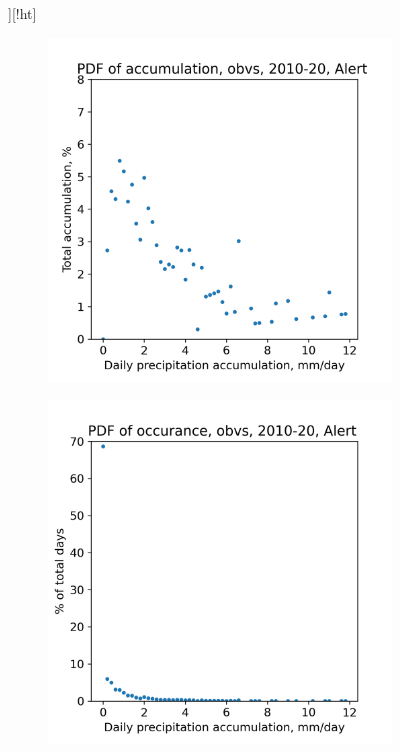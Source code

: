 \documentclass[draft]{agujournal2019}
\begin{document}
    \begin{figure}[h!tbp]][!ht]
\centering
    \begin{subfigure}{0.45\linewidth}
        \includegraphics[width=\linewidth]{figures/cdf_pdf/pdf_accum_alert_10_20.png}
    \caption{}
    \end{subfigure}
\hfil
    \begin{subfigure}{0.45\linewidth}
        \includegraphics[width=\linewidth]{figures/cdf_pdf/pdf_occurance_alert_10_20.png}
    \caption{}
    \end{subfigure}


\end{figure}
\end{document}
